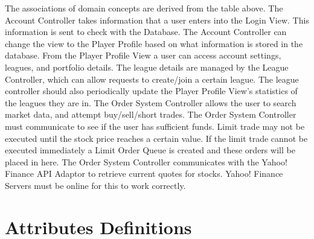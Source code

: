 The associations of domain concepts are derived from the table above.
The Account Controller takes information that a user enters into the
Login View. This information is sent to check with the Database. The
Account Controller can change the view to the Player Profile based on
what information is stored in the database. From the Player Profile
View a user can access account settings, leagues, and portfolio details.
The league details are managed by the League Controller, which can allow
requests to create/join a certain league. The league controller should
also periodically update the Player Profile View’s statistics of the
leagues they are in. The Order System Controller allows the user to
search market data, and attempt buy/sell/short trades. The Order System
Controller must communicate to see if the user has sufficient funds.
Limit trade may not be executed until the stock price reaches a certain
value. If the limit trade cannot be executed immediately a Limit Order
Queue is created and these orders will be placed in here. The Order
System Controller communicates with the Yahoo! Finance API Adaptor to
retrieve current quotes for stocks. Yahoo! Finance Servers must be
online for this to work correctly. \\

\section{Attributes Definitions}

